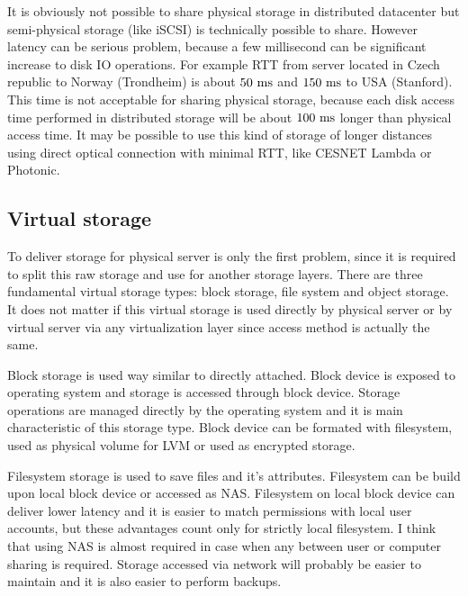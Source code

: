 It is obviously not possible to share physical storage in distributed datacenter but semi-physical storage (like \Ac{iSCSI}) is technically possible to share. However latency can be serious problem, because a few millisecond can be significant increase to disk \Ac{IO} operations. For example \Ac{RTT} from server located in Czech republic to Norway (Trondheim) is about $50~\mathrm{ms}$ and $150~\mathrm{ms}$ to USA (Stanford). This time is not acceptable for sharing physical storage, because each disk access time performed in distributed storage will be about $100~\mathrm{ms}$ longer than physical access time. It may be possible to use this kind of storage of longer distances using direct optical connection with minimal \Ac{RTT}, like CESNET Lambda or Photonic.

\subsection{Virtual storage}

To deliver storage for physical server is only the first problem, since it is required to split this raw storage and use for another storage layers. There are three fundamental virtual storage types: block storage, file system and object storage. It does not matter if this virtual storage is used directly by physical server or by virtual server via any virtualization layer since access method is actually the same.

Block storage is used way similar to directly attached. Block device is exposed to operating system and storage is accessed through block device. Storage operations are managed directly by the operating system and it is main characteristic of this storage type. Block device can be formated with filesystem, used as physical volume for \Ac{LVM} or used as encrypted storage.

Filesystem storage is used to save files and it's attributes. Filesystem can be build upon local block device or accessed as \Ac{NAS}. Filesystem on local block device can deliver lower latency and it is easier to match permissions with local user accounts, but these advantages count only for strictly local filesystem. I think that using \Ac{NAS} is almost required in case when any between user or computer sharing is required. Storage accessed via network will probably be easier to maintain and it is also easier to perform backups. 

